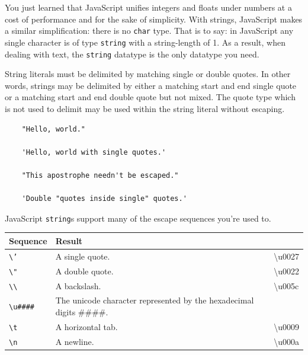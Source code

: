 \documentclass[11pt,letter]{book}
\begin{document}
    You just learned that JavaScript unifies integers and floats under numbers at a cost of 
    performance and for the sake of simplicity. With strings, JavaScript makes a similar 
    simplification: there is no \texttt{char} type. That is to say: in JavaScript any single 
    character is of type \texttt{string} with a string-length of 1. As a result, when dealing with  
    text, the \texttt{string} datatype is the only datatype you need.
    
    String literals must be delimited by matching single or double quotes. In other words, strings 
    may be delimited by either a matching start and end single quote or a matching start and end 
    double quote but not mixed. The quote type which is not used to delimit may be used within the 
    string literal without escaping.
    
    \begin{verbatim}
    "Hello, world."
    
    'Hello, world with single quotes.'
    
    "This apostrophe needn't be escaped."
    
    'Double "quotes inside single" quotes.'
    \end{verbatim}
    
    JavaScript \texttt{string}s support many of the escape sequences you're used to.
    
    \vspace{10pt}
    \begin{tabular}{l|l|l}
        Sequence & Result \\
        \hline
        \texttt{\textbackslash{'}}  & A single quote. & \textbackslash{u0027} \\
        \texttt{\textbackslash{"}}  & A double quote. & \textbackslash{u0022} \\
        \texttt{\textbackslash\textbackslash} 
                                    & A backslash. & \textbackslash{u005c} \\
        \texttt{\textbackslash{u\#\#\#\#}}
                                    & The unicode character represented by the hexadecimal
                                        digits \#\#\#\#. & \\
        \texttt{\textbackslash{t}}  & A horizontal tab. & \textbackslash{u0009} \\
        \texttt{\textbackslash{n}}  & A newline. & \textbackslash{u000a} \\
    \end{tabular}
    \vspace{10pt}
    
\end{document}
